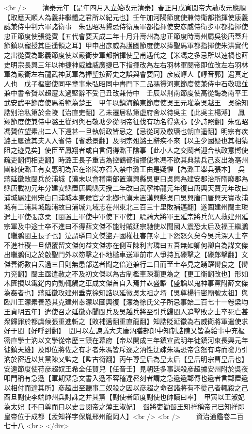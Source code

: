 <br />
　　清泰元年【是年四月入立始改元清泰】春正月戊寅閔帝大赦改元應順【取應天順人為義非繼體之君所以紀元也】壬午加河陽節度使兼侍衛都指揮使康義誠兼侍中判六軍諸衛事　朱弘昭馮贇忌侍衛馬軍都指揮使安彦威侍衛步軍都指揮使忠正節度使張從賓【五代會要天成二年十月升壽州為忠正節度時壽州屬吳後唐蓋升節鎮以寵授其臣遥領之耳】甲申出彦威為護國節度使以捧聖馬軍都指揮使朱洪實代之出從賓為彰義節度使以嚴衛步軍都指揮使皇甫遇代之【米馮之多忌所以速禍也薛史明宗長興三年以神捷神威雄威廣捷已下指揮改為左右羽林軍閔帝即位改左右羽林軍為嚴衛左右龍武神武軍為捧聖按薛史之誤與會要同】彦威崞人【崞音郭】遇真定人也　戊子樞密使同平章事朱弘昭同中書門下二品馮贇河東節度使兼侍中石敬瑭並兼中書令贇以超遷太過堅辭不受己丑改兼侍中　壬辰以荆南節度使高從誨為南平王武安武平節度使馬希範為楚王　甲午以鎮海鎮東節度使吳王元瓘為吳越王　吳徐知誥别治私第於金陵【治直吏翻】乙未遷居私第虛府舍以待吳主【此吳主楊溥】　鳳翔節度使兼侍中潞王從珂與石敬瑭少從明帝征伐有功名得衆心【少詩照翻】朱弘昭馮贇位望素出二人下遠甚一旦執朝政皆忌之【忌從珂及敬瑭也朝直遥翻】明宗有疾潞王屢遣其夫人入省侍【省悉景翻】及明宗殂潞王辭疾不來【以主少國疑也其相猜阻之迹見矣】使臣至鳳翔者或自言伺得潞王隂事【此小人之交鬬者迎合執政意嚮使疏吏翻伺相吏翻】時潞王長子重吉為控鶴都指揮使朱馮不欲其典禁兵己亥出為亳州團練使潞王有女惠明為尼在洛陽亦召入禁中潞王由是疑懼【為潞王舉兵張本】　吳蔣延徽敗閩兵於浦城【漢末以會稽南部置漢興縣吳更曰吳興為建安郡治所隋廢郡為縣唐載初元年分建安縣置唐興縣天授二年改曰武寧神龍元年復曰唐興天寶元年改曰浦城屬建州宋白曰浦城本東候官之北鄉也漢末置漢興縣吳曰吳興唐曰唐興天寶改浦城有二浦其城臨浦故曰浦城九域志在州東北三百三十里敗補邁翻】遂圍建州閩主璘遣上軍使張彦柔【閩置上軍使中軍使下軍使】驃騎大將軍王延宗將兵萬人救建州延宗軍及中途士卒不進曰不得薛文傑不能討賊延宗馳使以聞國人震恐太后及福王繼鵬【繼鵬閩主長子也】泣謂璘曰文傑盜弄國權枉害無辜上下怨怒久矣今吳兵深入士卒不進社稷一旦傾覆留文傑何益文傑亦在側互陳利害璘曰五吾無如卿何卿自為謀文傑出繼鵬伺之於啟聖門外以笏擊之仆地檻車送軍前市人爭持瓦礫擊之【礫郎撃翻】文傑善術數自云過三日則無患部送者聞之倍道兼行二日而至士卒見之踴躍臠食之【臠力兖翻】閩主亟遣赦之不及初文傑以為古制檻車疎濶更為之【更工衡翻改也】形如木匱攅以鐵鋩内向動輒觸之車成文傑首自入焉并誅盛韜【盛韜以鬼神事黨附薛文傑為姦者也】蔣延徽攻建州垂克徐知誥以延徽吳太祖之壻【吳尊楊行密廟號太祖】與臨川王濛素善恐其克建州奉濛以圖興復【濛為徐氏父子所忌事始二百七十一卷梁均王貞明五年】遣使召之延徽亦聞閩兵及吳越兵將至引兵歸閩人追擊敗之士卒死亡甚衆歸罪於都虞候張重進斬之【敗補邁翻重直龍翻】知誥貶延徽為右威衛將軍遣使求好于閩【好呼到翻】　閏月以左諫議大夫唐汭膳部郎中知制誥陳乂皆為給事中充樞密直學士汭以文學從帝歷三鎮在幕府【帝以開成三年鎮宣武明年徙鎮河東長興元年徙鎮天雄】及即位將佐之有才者朱馮皆斥逐之汭性迂疎朱馮恐帝含怒有時而發乃引汭於密近以其黨陳乂監之【監古銜翻】丙午尊皇后為皇太后【皇后明宗曹皇后也】安遠節度使苻彦超奴王希全任賀兒【任音壬】見朝廷多事謀殺彦超據安州附於吳夜叩門稱有急遞【軍期緊急文書入遞不容稽違晷刻者謂之急遞遞郵傳也遞者言郵置遞以相付而達其所】彦超出至聽事二奴殺之因以彦超之命召諸將有不從己者輒殺之己酉旦副使李端帥州兵討誅之并其黨【副使者節度副使也帥讀曰率】　甲寅以王淑妃為太妃【不曰尊而曰以史言閔帝之薄王淑妃】　蜀將吏勸蜀王知祥稱帝己巳知祥即皇帝位于成都【孟知祥字保胤邢州龍岡人】<br />
<br />
　　資治通鑑卷二百七十八  <br>
   </div> 

